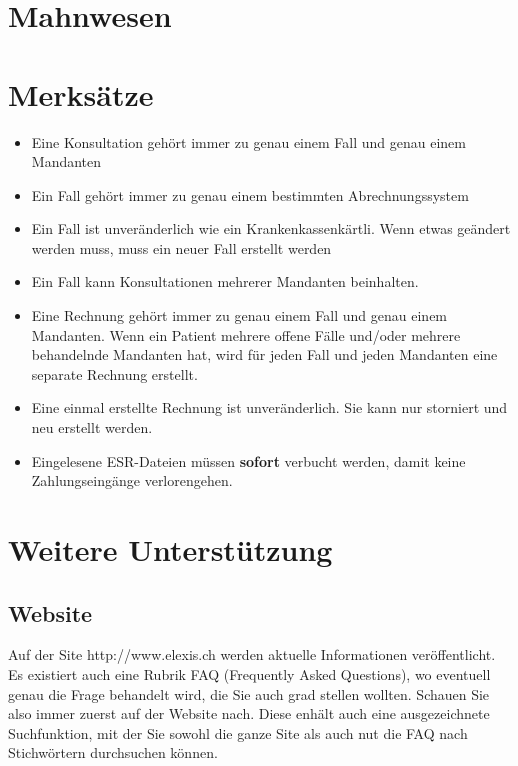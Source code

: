 \documentclass[a4paper]{scrartcl}
\begin{document}
\section{Mahnwesen}

\section{Merksätze}
\begin{itemize}
\item Eine Konsultation gehört immer zu genau einem Fall und genau einem Mandanten
\item Ein Fall gehört immer zu genau einem bestimmten Abrechnungssystem
\item Ein Fall ist unveränderlich wie ein Krankenkassenkärtli. Wenn etwas geändert werden muss, muss ein neuer Fall erstellt werden
\item Ein Fall kann Konsultationen mehrerer Mandanten beinhalten.
\item Eine Rechnung gehört immer zu genau einem Fall und genau einem Mandanten. Wenn ein Patient mehrere offene Fälle und/oder mehrere behandelnde Mandanten hat, wird für jeden Fall und jeden Mandanten eine separate Rechnung erstellt.
\item Eine einmal erstellte Rechnung ist unveränderlich. Sie kann nur storniert und neu erstellt werden.
\item Eingelesene ESR-Dateien müssen \textbf{sofort} verbucht werden, damit keine Zahlungseingänge verlorengehen.
\end{itemize}

\section{Weitere Unterstützung}
\subsection{Website}
Auf der Site http://www.elexis.ch werden aktuelle Informationen veröffentlicht. Es existiert auch eine Rubrik FAQ (Frequently Asked Questions), wo eventuell genau die Frage behandelt wird, die Sie auch grad stellen wollten. Schauen Sie also immer zuerst auf der Website nach. Diese enhält auch eine ausgezeichnete Suchfunktion, mit der Sie sowohl die ganze Site als auch nut die FAQ nach Stichwörtern durchsuchen können.
\end{document}
